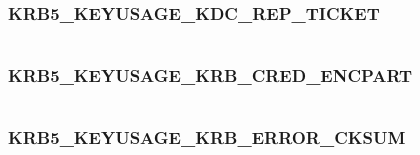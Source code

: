 \documentclass[letterpaper,10pt,english]{sphinxmanual}
\begin{document}
\subsubsection{KRB5\_KEYUSAGE\_KDC\_REP\_TICKET}
\label{appdev/refs/macros/KRB5_KEYUSAGE_KDC_REP_TICKET::doc}\label{appdev/refs/macros/KRB5_KEYUSAGE_KDC_REP_TICKET:krb5-keyusage-kdc-rep-ticket-data}\label{appdev/refs/macros/KRB5_KEYUSAGE_KDC_REP_TICKET:krb5-keyusage-kdc-rep-ticket}

\begin{fulllineitems}
\label{appdev/refs/macros/KRB5_KEYUSAGE_KDC_REP_TICKET:KRB5_KEYUSAGE_KDC_REP_TICKET}
\end{fulllineitems}


\begin{tabulary}{\linewidth}{|L|L|}
\hline

 & 
\\\hline
\end{tabulary}



\subsubsection{KRB5\_KEYUSAGE\_KRB\_CRED\_ENCPART}
\label{appdev/refs/macros/KRB5_KEYUSAGE_KRB_CRED_ENCPART:krb5-keyusage-krb-cred-encpart-data}\label{appdev/refs/macros/KRB5_KEYUSAGE_KRB_CRED_ENCPART::doc}\label{appdev/refs/macros/KRB5_KEYUSAGE_KRB_CRED_ENCPART:krb5-keyusage-krb-cred-encpart}

\begin{fulllineitems}
\label{appdev/refs/macros/KRB5_KEYUSAGE_KRB_CRED_ENCPART:KRB5_KEYUSAGE_KRB_CRED_ENCPART}
\end{fulllineitems}


\begin{tabulary}{\linewidth}{|L|L|}
\hline

 & 
\\\hline
\end{tabulary}



\subsubsection{KRB5\_KEYUSAGE\_KRB\_ERROR\_CKSUM}
\label{appdev/refs/macros/KRB5_KEYUSAGE_KRB_ERROR_CKSUM:krb5-keyusage-krb-error-cksum-data}\label{appdev/refs/macros/KRB5_KEYUSAGE_KRB_ERROR_CKSUM::doc}\label{appdev/refs/macros/KRB5_KEYUSAGE_KRB_ERROR_CKSUM:krb5-keyusage-krb-error-cksum}
\end{document}
